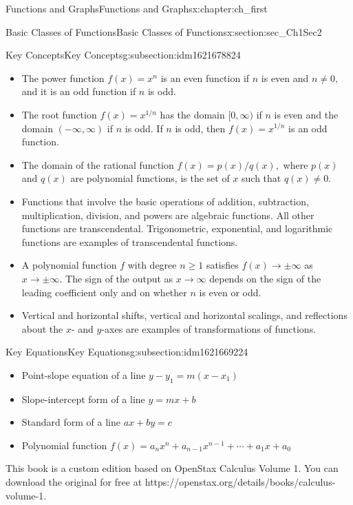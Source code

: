 \documentclass[oneside,10pt,]{book}
\numberwithin{equation}{section}
\begin{document}
\begin{chapterptx}{Functions and Graphs}{}{Functions and Graphs}{}{}{x:chapter:ch_first}
\begin{sectionptx}{Basic Classes of Functions}{}{Basic Classes of Functions}{}{}{x:section:sec_Ch1Sec2}
\begin{subsectionptx}{Key Concepts}{}{Key Concepts}{}{}{g:subsection:idm1621678824}
\begin{itemize}[label=\textbullet]
\item{}The power function \(f(x)=x^n\) is an even function if \(n\) is even and \(n\neq  0 ,\) and it is an odd function if \(n\) is odd.%
\item{}The root function \(f(x)=x^{1/n}\) has the domain \([ 0 ,\infty)\) if \(n\) is even and the domain \((-\infty,\infty)\) if \(n\) is odd. If \(n\) is odd, then \(f(x)= x^{1/n}\) is an odd function.%
\item{}The domain of the rational function \(f(x)=p(x) /q(x),\) where \(p(x)\) and \(q(x)\) are polynomial functions, is the set of \(x\) such that \(q(x)\neq  0 .\)%
\item{}Functions that involve the basic operations of addition, subtraction, multiplication, division, and powers are algebraic functions. All other functions are transcendental. Trigonometric, exponential, and logarithmic functions are examples of transcendental functions.%
\item{}A polynomial function \(f\) with degree \(n\geq  1 \) satisfies \(f(x)\to \pm\infty\) as \(x\to \pm\infty.\) The sign of the output as \(x\to \infty\) depends on the sign of the leading coefficient only and on whether \(n\) is even or odd.%
\item{}Vertical and horizontal shifts, vertical and horizontal scalings, and reflections about the \(x\)- and \(y\)-axes are examples of transformations of functions.%
\end{itemize}
\end{subsectionptx}
%
%
\typeout{************************************************}
\typeout{************************************************}
%
\begin{subsectionptx}{Key Equations}{}{Key Equations}{}{}{g:subsection:idm1621669224}
%
\begin{itemize}[label=\textbullet]
\item{}Point-slope equation of a line \(y-y_1=m(x-x_1)\)%
\item{}Slope-intercept form of a line \(y=mx+b\)%
\item{}Standard form of a line \(ax+by=c\)%
\item{}Polynomial function \(f(x)=a_nx^n+a_{n-1}x^{n-1}+\cdots+a_1x+a_0\)%
\end{itemize}
\end{subsectionptx}
This book is a custom edition based on OpenStax Calculus Volume 1. You can download the original for free at https:\slash{}\slash{}openstax.org\slash{}details\slash{}books\slash{}calculus-volume-1.%

\end{sectionptx}
\end{chapterptx}
\end{document}
